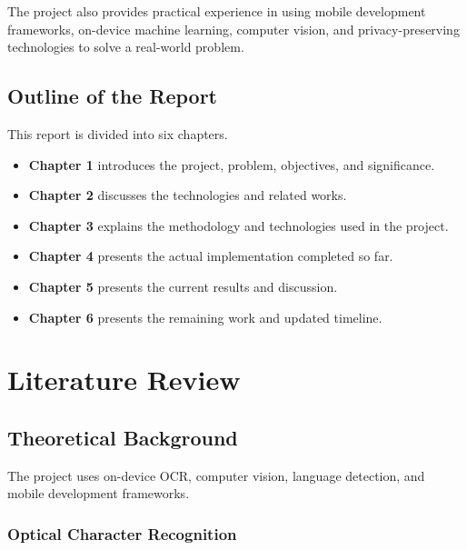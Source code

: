 \documentclass[12pt,a4paper]{report}
\begin{document}
The project also provides practical experience in using mobile development frameworks, on-device machine learning, computer vision, and privacy-preserving technologies to solve a real-world problem.

\section{Outline of the Report}

This report is divided into six chapters.

\begin{itemize}
    \item \textbf{Chapter 1} introduces the project, problem, objectives, and significance.
    
    \item \textbf{Chapter 2} discusses the technologies and related works.
    
    \item \textbf{Chapter 3} explains the methodology and technologies used in the project.
    
    \item \textbf{Chapter 4} presents the actual implementation completed so far.
    
    \item \textbf{Chapter 5} presents the current results and discussion.
    
    \item \textbf{Chapter 6} presents the remaining work and updated timeline.
\end{itemize}


\chapter{Literature Review}

\section{Theoretical Background}

The project uses on-device OCR, computer vision, language detection, and mobile development frameworks.

\subsection{Optical Character Recognition}
\end{document}
